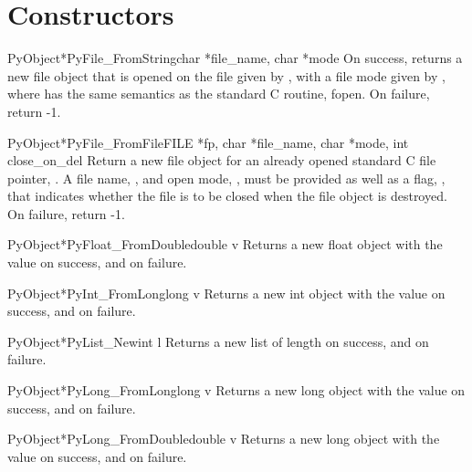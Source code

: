 \section{Constructors}

     \begin{cfuncdesc}{PyObject*}{PyFile_FromString}{char *file_name, char *mode}
	 On success, returns a new file object that is opened on the
	 file given by , with a file mode given by ,
	 where  has the same semantics as the standard C routine,
	 fopen.  On failure, return -1.
     \end{cfuncdesc}
     
     \begin{cfuncdesc}{PyObject*}{PyFile_FromFile}{FILE *fp, char *file_name, char *mode, int close_on_del}
	 Return a new file object for an already opened standard C
	 file pointer, .  A file name, , and open mode,
	 , must be provided as well as a flag, , that
	 indicates whether the file is to be closed when the file
	 object is destroyed.  On failure, return -1.
     \end{cfuncdesc}

     \begin{cfuncdesc}{PyObject*}{PyFloat_FromDouble}{double v}
	 Returns a new float object with the value  on success, and
	 {\NULL} on failure.
     \end{cfuncdesc}
     
     \begin{cfuncdesc}{PyObject*}{PyInt_FromLong}{long v}
	 Returns a new int object with the value  on success, and
	 {\NULL} on failure.
     \end{cfuncdesc}

     \begin{cfuncdesc}{PyObject*}{PyList_New}{int l}
	 Returns a new list of length  on success, and {\NULL} on
	 failure.
     \end{cfuncdesc}

     \begin{cfuncdesc}{PyObject*}{PyLong_FromLong}{long v}
	 Returns a new long object with the value  on success, and
	 {\NULL} on failure.
     \end{cfuncdesc}

     \begin{cfuncdesc}{PyObject*}{PyLong_FromDouble}{double v}
	 Returns a new long object with the value  on success, and
	 {\NULL} on failure.
     \end{cfuncdesc}

